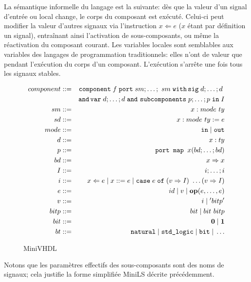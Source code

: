 \documentclass[a4paper]{article}
\newcommand{\minils}{{\sc MiniLS}}
\newcommand{\p}[0]{\; \vert \;}
\newcommand{\mybox}[1]{\mbox{\tt{#1}}}
\newcommand{\Coloneqq}[0]{::=}
\newcommand{\coloneqq}[0]{::=}
\newcommand{\Op}[2]{\mybox{\bf{op}}(#1,\dots,#2)}
\newcommand{\Assign}[2]{#1 \Leftarrow #2}
\newcommand{\Affect}[2]{#1 \coloneqq #2}
\newcommand{\Case}[5]{\mybox{case} \; #1 \; \mybox{of} \; (#2 \Rightarrow #3) \
  \dots (#4 \Rightarrow #5)}
\begin{document}
La sémantique informelle du langage est la suivante: dès que la valeur d'un
signal d'entrée ou local change, le corps du composant est exécuté. Celui-ci
peut modifier la valeur d'autres signaux via l'instruction $x \Leftarrow e$ ($x$
étant par définition un signal), entraînant ainsi l'activation de
sous-composants, ou même la réactivation du composant courant. Les variables
locales sont semblables aux variables des langages de programmation
traditionnels: elles n'ont de valeur que pendant l'exécution du corps d'un
composant. L'exécution s'arrête une fois tous les signaux stables.

\begin{figure}[t]
  \centering
  \begin{eqnarray*}
    component & \Coloneqq & \mybox{component} \; f \; \mybox{port} \; sm;\dots;\
    sm \; \mybox{with} \, \mybox{sig} \; d; \dots; d \; \\
    & & \mybox{and} \, \mybox{var} \; d; \dots; d \; \mybox{and} \
    \mybox{subcomponents} \; p; \dots; p \; \mybox{in} \; I \\
    sm & \Coloneqq & x : mode \ ty \\
    sd & \Coloneqq & x : mode \ ty := e \\
    mode & \Coloneqq & \mybox{in} \p \mybox{out} \\
    d & \Coloneqq & x : ty \\
    p & \Coloneqq & \mybox{port map } x (bd;\dots;bd) \\
    bd & \Coloneqq & x \Rightarrow x \\
    I & \coloneqq & i; \dots; i \\
    i & \Coloneqq & \Assign{x}{e} \p \Affect{x}{e} \p \Case{e}{v}{I}{v}{I} \\
    e & \Coloneqq & id \; \vert \; v \; \vert \; \Op{e}{e} \\
    v & \Coloneqq & i \; \vert \; ' bitp ' \\
    bitp & \Coloneqq & bit \p bit \  bitp \\
    bit & \Coloneqq & \mathbf{0} \p \mathbf{1} \\
    bt & \Coloneqq & \mybox{natural} \p \mybox{std\_logic} \p \mybox{bit}
    \p \dots
  \end{eqnarray*}
  \caption{MiniVHDL}
  \label{fig:mvhdl}
\end{figure}

Notons que les paramètres effectifs des sous-composants sont des noms de
signaux; cela justifie la forme simplifiée \minils{} décrite précédemment.
\end{document}
